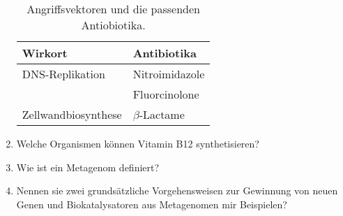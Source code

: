 \begin{enumerate}
		\begin{table}[ht!]
		\begin{center}
		\begin{tabular}{l l} 
		\toprule
			Wirkort	&	Antibiotika \\
			\midrule
			DNS-Replikation		&	Nitroimidazole \\
										&	Fluorcinolone 	\\
			Zellwandbiosynthese	&	\begin{math}\beta\end{math}-Lactame \\
		\bottomrule
		\end{tabular}
		\label{tab:wirkorteantibiose}
		\caption{Angriffsvektoren und die passenden Antiobiotika.}
		\end{center}
		\end{table}

	\item Welche Organismen können Vitamin B12 synthetisieren?
	\item Wie ist ein Metagenom definiert?
	\item Nennen sie zwei grundsätzliche Vorgehensweisen zur Gewinnung von neuen Genen und Biokatalysatoren aus Metagenomen mir Beispielen?
\end{enumerate}
